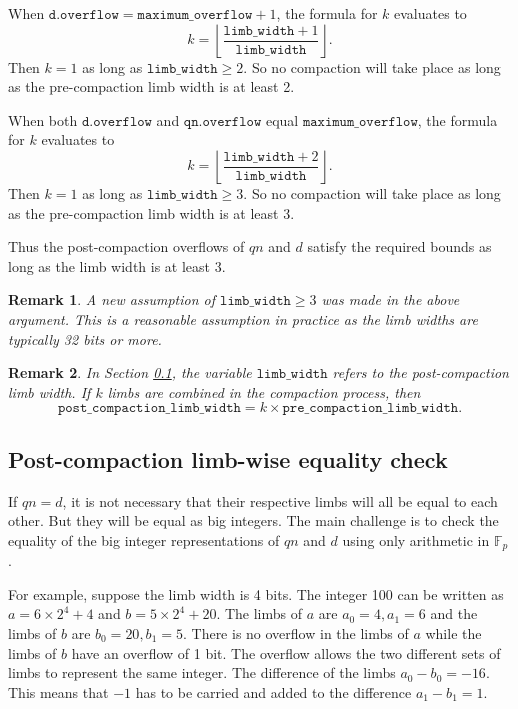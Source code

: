 \documentclass[a4paper, 12pt]{article}
\newtheorem*{remark}{Remark}
\begin{document}
When $\texttt{d.overflow} = \texttt{maximum\_overflow}+ 1$, the formula for $k$ evaluates to
$$
k = \left\lfloor \frac{\texttt{limb\_width}+ 1}{\texttt{limb\_width}}\right\rfloor.
$$
Then $k = 1$ as long as $\texttt{limb\_width} \ge 2$. So no compaction will take place as long as the pre-compaction limb width is at least 2.

When both $\texttt{d.overflow}$ and $\texttt{qn.overflow}$ equal $\texttt{maximum\_overflow}$, the formula for $k$ evaluates to
$$
k = \left\lfloor \frac{\texttt{limb\_width}+ 2}{\texttt{limb\_width}}\right\rfloor.
$$
Then $k = 1$ as long as $\texttt{limb\_width} \ge 3$. So no compaction will take place as long as the pre-compaction limb width is at least 3.

Thus the post-compaction overflows of $qn$ and $d$ satisfy the required bounds as long as the limb width is at least 3.
\begin{remark}
A new assumption of $\texttt{limb\_width} \ge 3$ was made in the above argument. This is a reasonable assumption in practice as the limb widths are typically 32 bits or more.
\end{remark}

\begin{remark}
  In Section \ref{sub:post_compaction_limb_wise_equality_check}, the variable $\texttt{limb\_width}$ refers to the post-compaction limb width. If $k$ limbs are combined in the compaction process, then $$\texttt{post\_compaction\_limb\_width} = k \times \texttt{pre\_compaction\_limb\_width}.$$
\end{remark}

\subsection{Post-compaction limb-wise equality check}%
\label{sub:post_compaction_limb_wise_equality_check}

If $qn = d$, it is not necessary that their respective limbs will all be equal to each other. But they will be equal as big integers. 
 The main challenge is to check the equality of the big integer representations of $qn$ and $d$ using only arithmetic in $\mathbb{F}_p$.

For example, suppose the limb width is 4 bits. The integer 100 can be written as $a = 6 \times 2^4 + 4$ and $b = 5 \times 2^4  +20$. The limbs of $a$ are $a_0=4, a_1=6$ and the limbs of $b$ are $b_0 = 20, b_1 =5$. There is no overflow in the limbs of $a$ while the limbs of $b$ have an overflow of 1 bit. The overflow allows the two different sets of limbs to represent the same integer. The difference of the limbs $a_0 - b_0 = -16$. This means that $-1$ has to be carried and added to the difference $a_1 - b_1 = 1$.
\end{document}
